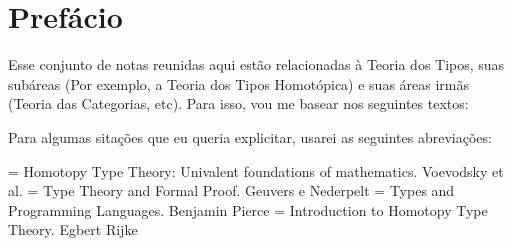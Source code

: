 \documentclass[../main.tex]{subfiles}
\begin{document}
\section{Prefácio}

Esse conjunto de notas reunidas aqui estão relacionadas à Teoria dos Tipos, suas subáreas (Por exemplo, a Teoria dos Tipos Homotópica) e suas áreas irmãs (Teoria das Categorias, etc). Para isso, vou me basear nos seguintes textos:

Para algumas sitações que eu queria explicitar, usarei as seguintes abreviações:

\noindent[HoTT] = Homotopy Type Theory: Univalent foundations of mathematics. Voevodsky et al. \newline
[TTFP] = Type Theory and Formal Proof. Geuvers e Nederpelt \newline
[TPL] = Types and Programming Languages. Benjamin Pierce \newline
[IHoTT] = Introduction to Homotopy Type Theory. Egbert Rijke \newline
\end{document}
